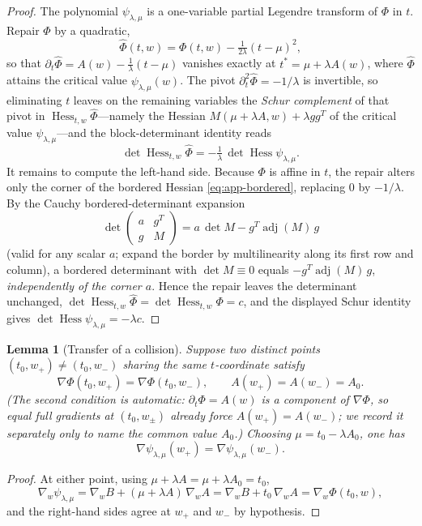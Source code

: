 \documentclass[11pt]{article}
\theoremstyle{plain}
\newtheorem{lemma}[theorem]{Lemma}
\theoremstyle{definition}
\newcommand{\Hess}{\operatorname{Hess}}
\newcommand{\adj}{\operatorname{adj}}
\begin{document}
\begin{proof}
The polynomial $\psi_{\lambda,\mu}$ is a one-variable partial Legendre
transform of $\Phi$ in $t$. Repair $\Phi$ by a quadratic,
\[
\widehat\Phi(t,w)=\Phi(t,w)-\tfrac{1}{2\lambda}(t-\mu)^{2},
\]
so that $\partial_t\widehat\Phi=A(w)-\tfrac1\lambda(t-\mu)$ vanishes
exactly at $t^{*}=\mu+\lambda A(w)$, where $\widehat\Phi$ attains the
critical value $\psi_{\lambda,\mu}(w)$. The pivot
$\partial_t^2\widehat\Phi=-1/\lambda$ is invertible, so eliminating $t$
leaves on the remaining variables the \emph{Schur complement} of that
pivot in $\Hess_{t,w}\widehat\Phi$---namely the Hessian
$M(\mu+\lambda A,w)+\lambda gg^{T}$ of the critical value
$\psi_{\lambda,\mu}$---and the block-determinant identity reads
\[
\det\Hess_{t,w}\widehat\Phi
=-\tfrac1\lambda\,\det\Hess\psi_{\lambda,\mu}.
\]
It remains to compute the left-hand side. Because $\Phi$ is affine in
$t$, the repair alters only the corner of the bordered Hessian
\eqref{eq:app-bordered}, replacing $0$ by $-1/\lambda$. By the Cauchy
bordered-determinant expansion
\begin{equation}
\det\begin{pmatrix} a & g^{T}\\ g & M\end{pmatrix}
= a\,\det M - g^{T}\adj(M)\,g
\label{eq:app-cauchy}
\end{equation}
(valid for any scalar $a$; expand the border by multilinearity along its
first row and column), a bordered determinant with $\det M\equiv0$
equals $-g^{T}\adj(M)\,g$, \emph{independently of the corner $a$}. Hence
the repair leaves the determinant unchanged,
$\det\Hess_{t,w}\widehat\Phi=\det\Hess_{t,w}\Phi=c$, and the displayed
Schur identity gives $\det\Hess\psi_{\lambda,\mu}=-\lambda c$.
\end{proof}

\begin{lemma}[Transfer of a collision]
\label{lem:collision-transfer}
Suppose two distinct points $(t_0,w_+)\ne(t_0,w_-)$ sharing the same
$t$-coordinate satisfy
\[
\nabla\Phi(t_0,w_+)=\nabla\Phi(t_0,w_-),
\qquad
A(w_+)=A(w_-)=A_0 .
\]
(The second condition is automatic: $\partial_t\Phi=A(w)$ is a component
of $\nabla\Phi$, so equal full gradients at $(t_0,w_\pm)$ already force
$A(w_+)=A(w_-)$; we record it separately only to name the common value
$A_0$.) Choosing $\mu=t_0-\lambda A_0$, one has
\[
\nabla\psi_{\lambda,\mu}(w_+)=\nabla\psi_{\lambda,\mu}(w_-).
\]
\end{lemma}

\begin{proof}
At either point, using $\mu+\lambda A=\mu+\lambda A_0=t_0$,
\[
\nabla_w\psi_{\lambda,\mu}
=\nabla_w B+(\mu+\lambda A)\,\nabla_w A
=\nabla_w B+t_0\,\nabla_w A
=\nabla_w\Phi(t_0,w),
\]
and the right-hand sides agree at $w_+$ and $w_-$ by hypothesis.
\end{proof}
\end{document}
